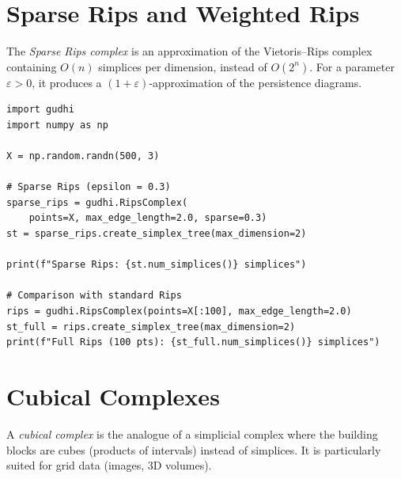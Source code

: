 \section{Sparse Rips and Weighted Rips}

\begin{definition}
The \emph{Sparse Rips complex} is an approximation of the Vietoris--Rips
complex containing $O(n)$ simplices per dimension, instead of $O(2^n)$.
For a parameter $\varepsilon > 0$, it produces a
$(1+\varepsilon)$-approximation of the persistence diagrams.
\end{definition}

\begin{codeblock}[title=\textbf{Sparse Rips with GUDHI}]
\begin{verbatim}
import gudhi
import numpy as np

X = np.random.randn(500, 3)

# Sparse Rips (epsilon = 0.3)
sparse_rips = gudhi.RipsComplex(
    points=X, max_edge_length=2.0, sparse=0.3)
st = sparse_rips.create_simplex_tree(max_dimension=2)

print(f"Sparse Rips: {st.num_simplices()} simplices")

# Comparison with standard Rips
rips = gudhi.RipsComplex(points=X[:100], max_edge_length=2.0)
st_full = rips.create_simplex_tree(max_dimension=2)
print(f"Full Rips (100 pts): {st_full.num_simplices()} simplices")
\end{verbatim}
\end{codeblock}

\section{Cubical Complexes}

\begin{definition}
A \emph{cubical complex} is the analogue of a simplicial complex where
the building blocks are cubes (products of intervals) instead of
simplices. It is particularly suited for grid data (images, 3D volumes).
\end{definition}

